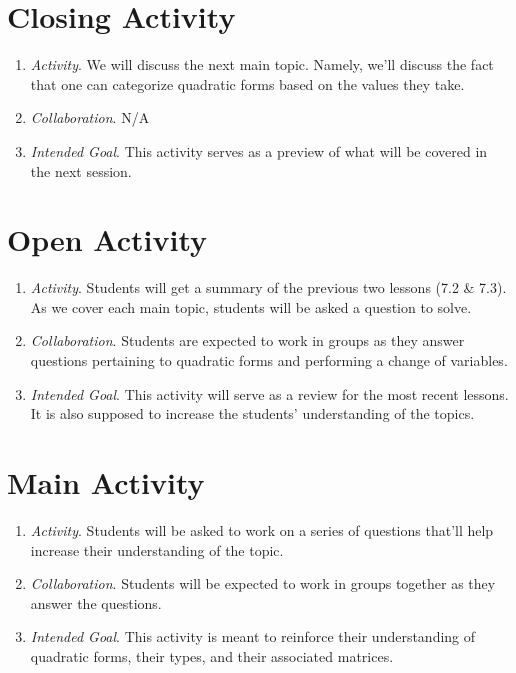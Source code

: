 \documentclass[11pt]{article}
\begin{document}
\section{\centering Closing Activity}
	\begin{enumerate}
		\item \textit{Activity}. We will discuss the next main topic. Namely, we'll discuss the fact that one can categorize quadratic forms based on the values 
						they take.
		\item \textit{Collaboration}. N/A
		\item \textit{Intended Goal}. This activity serves as a preview of what will be covered in the next session.
	\end{enumerate}

\newpage
{}
\section{\centering Open Activity}
	\begin{enumerate}
		\item \textit{Activity}. Students will get a summary of the previous two lessons (7.2 \& 7.3). As we cover each main topic, students will be asked a 
						question to solve.
		\item \textit{Collaboration}.  Students are expected to work in groups as they answer questions pertaining to quadratic forms and performing a 
						change of variables.
		\item \textit{Intended Goal}. This activity will serve as a review for the most recent lessons. It is also supposed to increase the students' understanding
						of the topics.
	\end{enumerate}

\section{\centering Main Activity}
	\begin{enumerate}
		\item \textit{Activity}. Students will be asked to work on a series of questions that'll help increase their understanding of the topic.
		\item \textit{Collaboration}. Students will be expected to work in groups together as they answer the questions.
		\item \textit{Intended Goal}. This activity is meant to reinforce their understanding of quadratic forms, their types, and their associated matrices.
	\end{enumerate}
\end{document}
